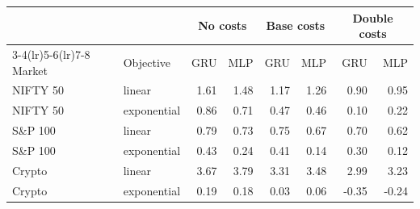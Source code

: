 \begin{tabular}{llrrrrrr}
\toprule
& & \multicolumn{2}{c}{No costs} & \multicolumn{2}{c}{Base costs} & \multicolumn{2}{c}{Double costs} \\
\cmidrule(lr){3-4}\cmidrule(lr){5-6}\cmidrule(lr){7-8}
Market & Objective & GRU & MLP & GRU & MLP & GRU & MLP \\
\midrule
NIFTY 50 & linear & 1.61 & 1.48 & 1.17 & 1.26 & 0.90 & 0.95 \\
NIFTY 50 & exponential & 0.86 & 0.71 & 0.47 & 0.46 & 0.10 & 0.22 \\
S\&P 100 & linear & 0.79 & 0.73 & 0.75 & 0.67 & 0.70 & 0.62 \\
S\&P 100 & exponential & 0.43 & 0.24 & 0.41 & 0.14 & 0.30 & 0.12 \\
Crypto & linear & 3.67 & 3.79 & 3.31 & 3.48 & 2.99 & 3.23 \\
Crypto & exponential & 0.19 & 0.18 & 0.03 & 0.06 & -0.35 & -0.24 \\
\bottomrule
\end{tabular}
